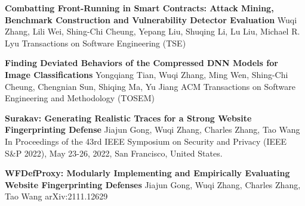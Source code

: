 %
%
%


\begin{scholarship}
	{\textbf{Combatting Front-Running in Smart Contracts: Attack Mining, Benchmark Construction and Vulnerability Detector Evaluation}}
	{Wuqi Zhang, Lili Wei, Shing-Chi Cheung, Yepang Liu, Shuqing Li, Lu Liu, Michael R. Lyu}
	\scholarshipentry{}
	{Transactions on Software Engineering (TSE)}

	{\textbf{Finding Deviated Behaviors of the Compressed DNN Models for Image Classifications}}
	{Yongqiang Tian, Wuqi Zhang, Ming Wen, Shing-Chi Cheung, Chengnian Sun, Shiqing Ma, Yu Jiang}
	\scholarshipentry{}
	{ACM Transactions on Software Engineering and Methodology (TOSEM)}


	{\textbf{Surakav: Generating Realistic Traces for a Strong Website Fingerprinting Defense}}
	{Jiajun Gong, Wuqi Zhang, Charles Zhang, Tao Wang}
	\scholarshipentry{}
	{In Proceedings of the 43rd IEEE Symposium on Security and Privacy (IEEE S\&P 2022), May 23-26, 2022, San Francisco, United States.}


	{\textbf{WFDefProxy: Modularly Implementing and Empirically Evaluating Website Fingerprinting Defenses}}
	{Jiajun Gong, Wuqi Zhang, Charles Zhang, Tao Wang}
	\scholarshipentry{}
	{arXiv:2111.12629}


\end{scholarship}
